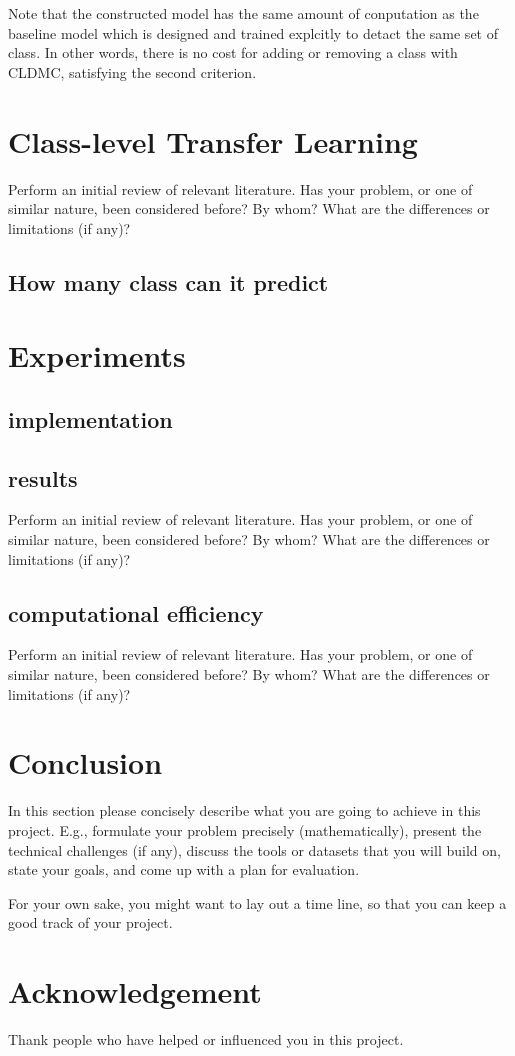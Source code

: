 \documentclass{article}
\begin{document}
Note that the constructed model has the same amount of conputation as the baseline model which is designed and trained explcitly to detact the same set of class. In other words, there is no cost for adding or removing a class with CLDMC, satisfying the second criterion.

\section{Class-level Transfer Learning}

Perform an initial review of relevant literature. Has your problem, or one of similar nature, been considered before? By whom? What are the differences or limitations (if any)?

\subsection{How many class can it predict}

\section{Experiments}

\subsection{implementation}

\subsection{results}
Perform an initial review of relevant literature. Has your problem, or one of similar nature, been considered before? By whom? What are the differences or limitations (if any)?

\subsection{computational efficiency}
Perform an initial review of relevant literature. Has your problem, or one of similar nature, been considered before? By whom? What are the differences or limitations (if any)?

\section{Conclusion}
In this section please concisely describe what you are going to achieve in this project. E.g., formulate your problem precisely (mathematically), present the technical challenges (if any), discuss the tools or datasets that you will build on, state your goals, and come up with a plan for evaluation.

For your own sake, you might want to lay out a time line, so that you can keep a good track of your project.

\newpage

\section*{Acknowledgement}
Thank people who have helped or influenced you in this project.

\nocite{*}



\end{document}
